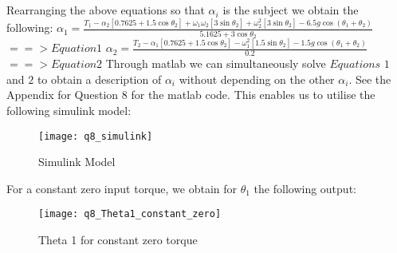 	\subsection{}
	Rearranging the above equations so that $\alpha _{i}$ is the subject we obtain the following:\newline\newline
	$ \alpha _{1} = \frac{T_{1} - \alpha _{2}[0.7625 + 1.5\cos \theta _{2}] + \omega _{1}\omega _{2}[3\sin \theta _{2}] + \omega^2 _{2}[3\sin \theta _{2}] - 6.5g\cos (\theta _{1} + \theta _{2})}{5.1625 + 3\cos \theta _{2}} $\newline 
	\hspace{20mm}$==> Equation 1$\newline\newline
	$ \alpha _{2} = \frac{T_{2} - \alpha _{1}[0.7625 + 1.5\cos \theta _{2}] - \omega^2 _{1}[1.5\sin \theta _{2}] - 1.5g\cos (\theta _{1} + \theta _{2})}{0.2} $\newline 
	\hspace{20mm}$==> Equation 2$\newline\newline
	\newline
	Through matlab we can simultaneously solve $Equations$ $1$ and $2$ to obtain a description of $\alpha _{i}$ without depending on the other $\alpha _{i}$.\newline
	See the Appendix for Question 8 for the matlab code.\newline
	This enables us to utilise the following simulink model:\newline
	\begin{figure}[position = here]
		\begin{centering}
			\texttt{[image: q8\_simulink]}\\
			\caption [WSpace]{Simulink Model}
		\end{centering}
	\end{figure}
	\newline
	\pagebreak
	For a constant zero input torque, we obtain for $\theta _{1}$ the following output:\newline
	\begin{figure}[position = here]
		\begin{centering}
			\texttt{[image: q8\_Theta1\_constant\_zero]}\\
			\caption [WSpace]{Theta 1 for constant zero torque}
		\end{centering}
	\end{figure}
	
